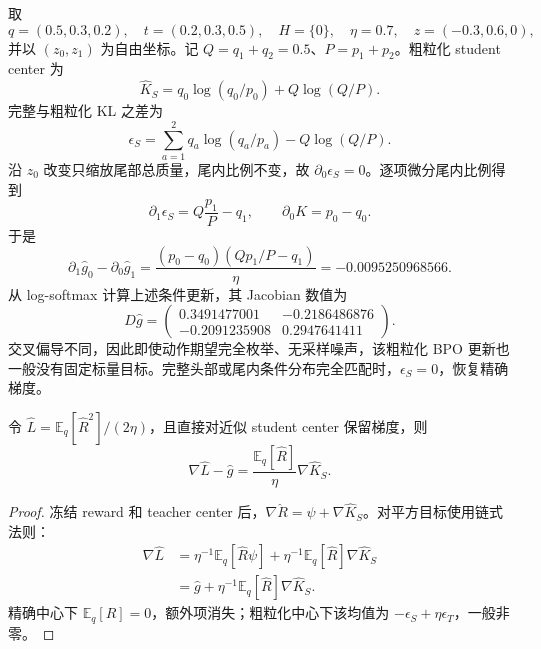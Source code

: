 \documentclass[lang=cn,scheme=chinese,openany]{../book/elegantbook}
\newcommand{\E}{\mathbb E}
\begin{document}
\begin{example}
\label{opd:curl-example}
取
\begin{equation}
q=(0.5,0.3,0.2),\quad t=(0.2,0.3,0.5),\quad H=\{0\},\quad
\eta=0.7,\quad z=(-0.3,0.6,0),
\end{equation}
并以 $(z_0,z_1)$ 为自由坐标。记 $Q=q_1+q_2=0.5$、$P=p_1+p_2$。粗粒化 student center 为
\begin{equation}
\widehat K_S=q_0\log(q_0/p_0)+Q\log(Q/P).
\end{equation}
完整与粗粒化 KL 之差为
\begin{equation}
\epsilon_S=\sum_{a=1}^2q_a\log(q_a/p_a)-Q\log(Q/P).
\end{equation}
沿 $z_0$ 改变只缩放尾部总质量，尾内比例不变，故 $\partial_0\epsilon_S=0$。逐项微分尾内比例得到
\begin{equation}
\partial_1\epsilon_S=Q\frac{p_1}{P}-q_1,\qquad
\partial_0K=p_0-q_0.
\end{equation}
于是
\begin{equation}
\partial_1\widehat g_0-\partial_0\widehat g_1
=\frac{(p_0-q_0)(Qp_1/P-q_1)}{\eta}
=-0.0095250968566.
\end{equation}
从 log-softmax 计算上述条件更新，其 Jacobian 数值为
\begin{equation}
D\widehat g=
\begin{pmatrix}
0.3491477001&-0.2186486876\\
-0.2091235908&0.2947641411
\end{pmatrix}.
\end{equation}
交叉偏导不同，因此即使动作期望完全枚举、无采样噪声，该粗粒化 BPO 更新也一般没有固定标量目标。完整头部或尾内条件分布完全匹配时，$\epsilon_S=0$，恢复精确梯度。
\end{example}

\begin{proposition}
\label{opd:approximate-square}
令 $\widehat L=\E_q[\widehat R^2]/(2\eta)$，且直接对近似 student center 保留梯度，则
\begin{equation}
\nabla\widehat L-\widehat g
=\frac{\E_q[\widehat R]}{\eta}\nabla\widehat K_S.
\end{equation}
\end{proposition}
\begin{proof}
冻结 reward 和 teacher center 后，$\nabla\widehat R=\psi+\nabla\widehat K_S$。对平方目标使用链式法则：
\begin{align}
\nabla\widehat L
&=\eta^{-1}\E_q[\widehat R\psi]
+\eta^{-1}\E_q[\widehat R]\nabla\widehat K_S\\
&=\widehat g+\eta^{-1}\E_q[\widehat R]\nabla\widehat K_S.
\end{align}
精确中心下 $\E_q[R]=0$，额外项消失；粗粒化中心下该均值为 $-\epsilon_S+\eta\epsilon_T$，一般非零。
\end{proof}
\end{document}
